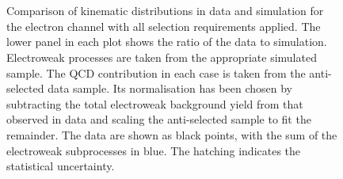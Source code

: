 \begin{figure}
\centering
{}
\\
\\
\caption{Comparison of kinematic distributions in data and simulation for the
  electron channel with all selection requirements applied. The lower panel in
  each plot shows the ratio of the data to simulation. Electroweak processes are
  taken from the appropriate simulated sample. The \ac{QCD} contribution in each
  case is taken from the anti-selected data sample. Its normalisation has been
  chosen by subtracting the total electroweak background yield from that
  observed in data and scaling the anti-selected sample to fit the
  remainder. The data are shown as black points, with the sum of the electroweak
  subprocesses in blue. The hatching indicates the statistical uncertainty.}
\label{fig:wpol_datamc_ele}
\end{figure}

